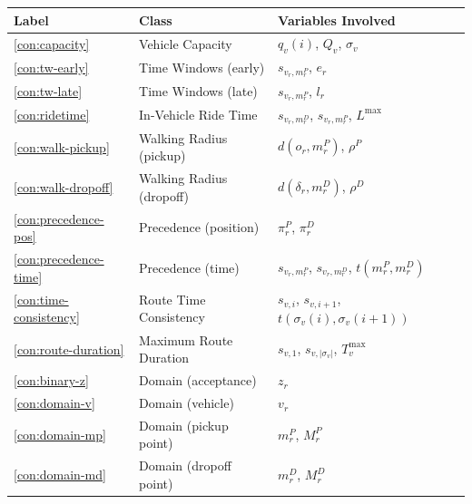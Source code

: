 \begin{tabular}{lll}
\toprule
\textbf{Label} & \textbf{Class} & \textbf{Variables Involved} \\
\midrule
\ref{con:capacity}         & Vehicle Capacity            & $q_v(i)$, $Q_v$, $\sigma_v$ \\
\ref{con:tw-early}         & Time Windows (early)        & $s_{v_r, m_r^P}$, $e_r$ \\
\ref{con:tw-late}          & Time Windows (late)         & $s_{v_r, m_r^P}$, $l_r$ \\
\ref{con:ridetime}         & In-Vehicle Ride Time        & $s_{v_r, m_r^D}$, $s_{v_r, m_r^P}$, $L^{\max}$ \\
\ref{con:walk-pickup}      & Walking Radius (pickup)     & $d(o_r, m_r^P)$, $\rho^P$ \\
\ref{con:walk-dropoff}     & Walking Radius (dropoff)    & $d(\delta_r, m_r^D)$, $\rho^D$ \\
\ref{con:precedence-pos}   & Precedence (position)       & $\pi_r^P$, $\pi_r^D$ \\
\ref{con:precedence-time}  & Precedence (time)           & $s_{v_r, m_r^P}$, $s_{v_r, m_r^D}$, $t(m_r^P, m_r^D)$ \\
\ref{con:time-consistency} & Route Time Consistency      & $s_{v,i}$, $s_{v,i+1}$, $t(\sigma_v(i), \sigma_v(i+1))$ \\
\ref{con:route-duration}   & Maximum Route Duration      & $s_{v,1}$, $s_{v,|\sigma_v|}$, $T_v^{\max}$ \\
\ref{con:binary-z}         & Domain (acceptance)         & $z_r$ \\
\ref{con:domain-v}         & Domain (vehicle)            & $v_r$ \\
\ref{con:domain-mp}        & Domain (pickup point)       & $m_r^P$, $M_r^P$ \\
\ref{con:domain-md}        & Domain (dropoff point)      & $m_r^D$, $M_r^D$ \\
\bottomrule
\end{tabular}
